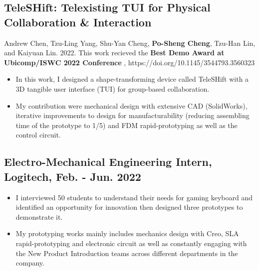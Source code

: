 \documentclass[12pt]{article}
\begin{document}
        \subsection*{TeleSHift: Telexisting TUI for Physical Collaboration \& Interaction}
        {\sffamily
        {\footnotesize Andrew Chen, Tzu-Ling Yang, Shu-Yan Cheng, \textbf{Po-Sheng Cheng}, Tzu-Han Lin, and Kaiyuan Lin. 2022. This work recieved the \textbf{Best Demo Award at Ubicomp/ISWC 2022 Conference}%
        , https://doi.org/10.1145/3544793.3560323}
        \begin{itemize}
            \item In this work, I designed a shape-transforming device called TeleSHift with a 3D tangible user interface (TUI) for group-based collaboration.
            \item My contribution were mechanical design with extensive CAD (SolidWorks), iterative improvements to design for manufacturability (reducing assembling time of the prototype to 1/5) and FDM rapid-prototyping as well as the control circuit.
        \end{itemize}
        }
        
        \subsection*{Electro-Mechanical Engineering Intern, Logitech, Feb. - Jun. 2022}
        {\sffamily
        \begin{itemize}
            \item I interviewed 50 students to understand their needs for gaming keyboard and identified an opportunity for innovation then designed three prototypes to demonstrate it.
            \item My prototyping works mainly includes mechanics design with Creo, SLA rapid-prototyping and electronic circuit as well as constantly engaging with the New Product Introduction teams across different departments in the company.
        \end{itemize}
        }
\end{document}
